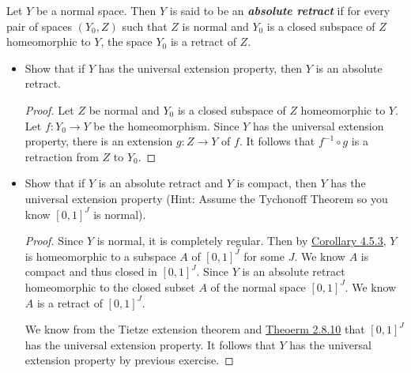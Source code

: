 \documentclass[12pt,a4paper]{article}
\begin{document}
    \begin{ex}
        Let $Y$ be a normal space. Then $Y$ is said to be an \textbf{\textit{absolute retract}} if for every pair of spaces $(Y_0,Z)$ such that $Z$ is normal and $Y_0$ is a closed subspace of $Z$ homeomorphic to $Y$, the space $Y_0$ is a retract of $Z$.
        \begin{itemize}
            \item Show that if $Y$ has the universal extension property, then $Y$ is an absolute retract.
            \begin{proof}
                Let $Z$ be normal and $Y_0$ is a closed subspace of $Z$ homeomorphic to $Y$. Let $f:Y_0\to Y$ be the homeomorphism. Since $Y$ has the universal extension property, there is an extension $g:Z\to Y$ of $f$. It follows that $f^{-1}\circ g$ is a retraction from $Z$ to $Y_0$.
            \end{proof}
            \item Show that if $Y$ is an absolute retract and $Y$ is compact, then $Y$ has the universal extension property (Hint: Assume the Tychonoff Theorem so you know $[0,1]^J$ is normal).
            \begin{proof}
                Since $Y$ is normal, it is completely regular. Then by \hyperref[4.5.3]{Corollary 4.5.3}, $Y$ is homeomorphic to a subspace $A$ of $[0,1]^J$ for some $J$. We know $A$ is compact and thus closed in $[0,1]^J$. Since $Y$ is an absolute retract homeomorphic to the closed subset $A$ of the normal space $[0,1]^J$. We know $A$ is a retract of $[0,1]^J$.
                
                We know from the Tietze extension theorem and \hyperref[2.8.10]{Theoerm 2.8.10} that $[0,1]^J$ has the universal extension property. It follows that $Y$ has the universal extension property by previous exercise.
            \end{proof}
        \end{itemize}
    \end{ex}
    \hfill
\end{document}
